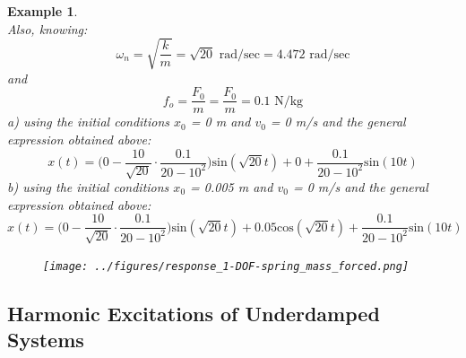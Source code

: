 \documentclass[12pt,letter]{article}
\newtheorem{ex}{Example}
\numberwithin{ex}{section} %
\newenvironment{example}{\begin{mdframed}[middlelinewidth=0.5mm]\begin{ex}\normalfont}{\end{ex}\end{mdframed}}
\numberwithin{re}{section} %
\begin{document}
\begin{example}
\begin{equation}
			\end{equation}								
			Also, knowing:
			\begin{equation}
				\omega_n = \sqrt{\frac{k}{m}} = \sqrt{20} \text{ rad/sec} =  4.472 \text{ rad/sec}
			\end{equation}				
			and
			\begin{equation}
				f_o = \frac{F_0}{m} = \frac{F_0}{m} = 0.1 \text{ N/kg}
			\end{equation}	
			a) using the initial conditions $x_0$ = 0 m and $v_0$ = 0 m/s and the general expression obtained above:
			\begin{equation}
				x(t) = \Big(0-\frac{10}{\sqrt{20}}\cdot \frac{0.1}{20-10^2}\Big)\text{sin}(\sqrt{20} t) + 0 + \frac{0.1}{20-10^2}\text{sin}(10 t)
			\end{equation}			
			b) using the initial conditions $x_0$ = 0.005 m and $v_0$ = 0 m/s and the general expression obtained above:
			\begin{equation}
				x(t) = \Big(0-\frac{10}{\sqrt{20}}\cdot \frac{0.1}{20-10^2}\Big)\text{sin}(\sqrt{20} t) + 0.05\text{cos}(\sqrt{20} t) + \frac{0.1}{20-10^2}\text{sin}(10 t)
			\end{equation}			
			\begin{figure}[H]
				\centering
				\texttt{[image: ../figures/response\_1-DOF-spring\_mass\_forced.png]}
			\end{figure}
\end{example}


	
		\subsection{Harmonic Excitations of Underdamped Systems}
\end{document}
